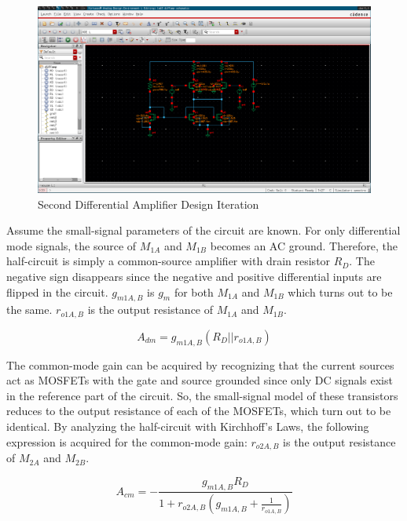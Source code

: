 \FloatBarrier

\begin{figure}[h!]
	\centering
	\includegraphics[scale=0.75]{../images/diff_amp_2.PNG}
	\caption{Second Differential Amplifier Design Iteration}
	\label{fig:diff_amp_2}
\end{figure}

\FloatBarrier

Assume the small-signal parameters of the circuit are known.
For only differential mode signals, the source of $M_{1A}$ and $M_{1B}$ becomes an AC ground.
Therefore, the half-circuit is simply a common-source amplifier with drain resistor $R_{D}$.
The negative sign disappears since the negative and positive differential inputs are flipped in the circuit.
$g_{m1A,B}$ is $g_{m}$ for both $M_{1A}$ and $M_{1B}$ which turns out to be the same.
$r_{o1A,B}$ is the output resistance of $M_{1A}$ and $M_{1B}$.

\begin{equation}
	\label{eq:dm_gain}
	A_{dm} = g_{m1A,B} ( R_{D} || r_{o1A,B} )
\end{equation}

The common-mode gain can be acquired by recognizing that the current sources act as MOSFETs with the gate and source grounded since only DC signals exist in the reference part of the circuit.
So, the small-signal model of these transistors reduces to the output resistance of each of the MOSFETs, which turn out to be identical.
By analyzing the half-circuit with Kirchhoff's Laws, the following expression is acquired for the common-mode gain:
$r_{o2A,B}$ is the output resistance of $M_{2A}$ and $M_{2B}$.

\begin{equation}
	\label{eq:cm_gain}
	A_{cm} = - \frac{ g_{m1A,B} R_{D} }{ 1 + r_{o2A,B} ( g_{m1A,B} + \frac{ 1 }{ r_{o1A,B} } ) }
\end{equation}

